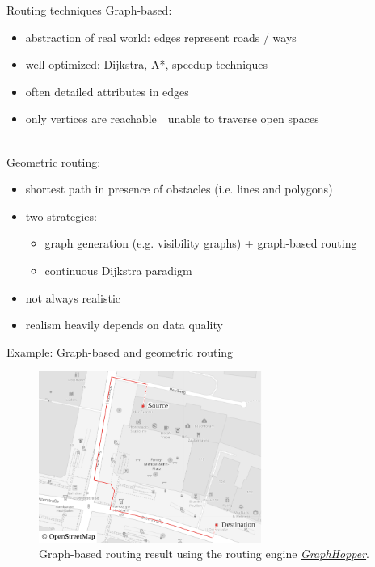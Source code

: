 \documentclass[xcolor={x11names}]{beamer}
\renewcommand{\n}{\hfill\\[0.5ex]}
\newcommand{\nn}{\hfill\\[2ex]}
\newenvironment{figcenter}
{%
	\parskip=0pt%
	\par%
	\nopagebreak%
	\centering%
}%
{%
	\par%
	\noindent%
	\ignorespacesafterend%
}
\begin{document}
		\begin{frame}{Routing techniques}
			Graph-based:\n
			\begin{itemize}
				\item abstraction of real world: edges represent roads / ways
				\item well optimized: Dijkstra, A*, speedup techniques
				\item often detailed attributes in edges
				\pause
				\item only vertices are reachable\ \textrightarrow\ unable to traverse open spaces
			\end{itemize}
			\nn
			\pause
			Geometric routing:\n
			\begin{itemize}
				\item shortest path in presence of obstacles (i.e. lines and polygons)
				\item two strategies:
				\begin{itemize}
					\item graph generation (e.g. visibility graphs) + graph-based routing
					\item continuous Dijkstra paradigm
				\end{itemize}
				\pause
				\item not always realistic
				\item realism heavily depends on data quality
			\end{itemize}
		\end{frame}
	
		\begin{frame}{Example: Graph-based and geometric routing}
			\begin{figure}[t]
				\begin{figcenter}
					\includegraphics[width=0.65\textwidth]{images/qgis-routing-osterstrasse_routing.pdf}
				\end{figcenter}
				\caption{Graph-based routing result using the routing engine \href{https://www.osm.org/directions?engine=graphhopper\_foot\&route=53.57657,9.95210;53.57601,9.95268}{\emph{GraphHopper}}.}
			\end{figure}
		\end{frame}
	
\end{document}
